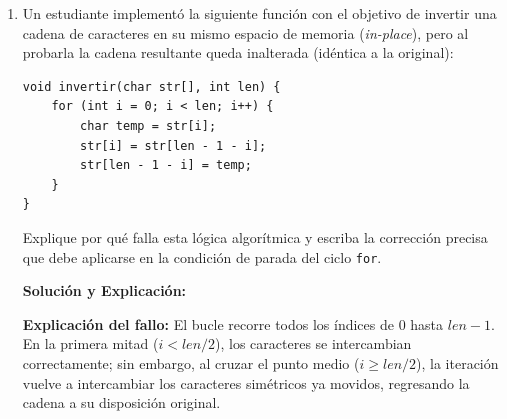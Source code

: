 \documentclass[11pt,letterpaper]{article}
\begin{document}
\begin{enumerate}[label=\textbf{\arabic*.}]
\begin{enumerate}[label=(\alph*)]
        \begin{solucionbox}
        \textbf{Solución y Explicación:}
        
        \begin{enumerate}[noitemsep]
            \item \textbf{Reserva mínima de memoria:} Se requieren exactamente \textbf{9 bytes}. Aunque la palabra \texttt{"SISTEMAS"} consta de 8 caracteres útiles, en C toda cadena terminada en nulo necesita un byte adicional para almacenar el carácter centinela \texttt{'\textbackslash 0'}. Si se reservan solo 8 bytes, la secuencia no constituye un string válido según la especificación de C.
            \item \textbf{Función de \texttt{'\textbackslash 0'}:} C no almacena la longitud de un string junto con la variable. Las funciones estándar como \texttt{printf("\%s", ...)} o \texttt{strlen} comienzan a leer desde la dirección de inicio e imprimen carácter por carácter de forma continua hasta encontrar un byte con valor numérico $0$ (\texttt{'\textbackslash 0'}). Si este terminador no existe, la función continúa leyendo fuera del buffer reservado, imprimiendo basura de memoria y provocando vulnerabilidades de acceso no autorizado o caídas por \textit{Segmentation Fault}.
        \end{enumerate}
        \end{solucionbox}

        \vspace{0.3cm}
        \item Un estudiante implementó la siguiente función con el objetivo de invertir una cadena de caracteres en su mismo espacio de memoria (\textit{in-place}), pero al probarla la cadena resultante queda inalterada (idéntica a la original):
        \begin{lstlisting}[style=customc]
void invertir(char str[], int len) {
    for (int i = 0; i < len; i++) {
        char temp = str[i];
        str[i] = str[len - 1 - i];
        str[len - 1 - i] = temp;
    }
}
        \end{lstlisting}
        Explique por qué falla esta lógica algorítmica y escriba la corrección precisa que debe aplicarse en la condición de parada del ciclo \texttt{for}.

        \begin{solucionbox}
        \textbf{Solución y Explicación:}
        
        \noindent \textbf{Explicación del fallo:} El bucle recorre todos los índices de $0$ hasta $len - 1$. En la primera mitad ($i < len / 2$), los caracteres se intercambian correctamente; sin embargo, al cruzar el punto medio ($i \ge len / 2$), la iteración vuelve a intercambiar los caracteres simétricos ya movidos, regresando la cadena a su disposición original.
        

\end{solucionbox}
\end{enumerate}
\end{enumerate}
\end{document}
